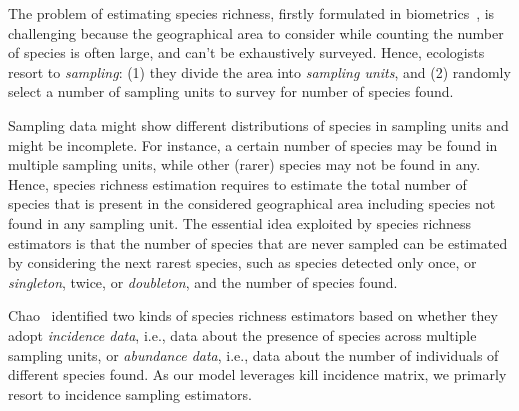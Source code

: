 \documentclass[sigconf,review,anonymous]{acmart}
\begin{document}
The problem of estimating species richness, firstly formulated in
biometrics~\cite{chao2016species}, is challenging because the geographical area
to consider while counting the number of species is often large, 
and can't be exhaustively surveyed.
%
Hence, ecologists resort to \emph{sampling}:
(1) they divide the area into \emph{sampling units}, and %
%
(2) randomly select a number of sampling units to survey for number of species found.

Sampling data might show different distributions of species in sampling units
and might be incomplete.
%
For instance, a certain number of species may be found in multiple sampling units,
while other (rarer) species may not be found in any. %
%
Hence, %
species richness estimation %
requires to estimate the total number of species that is present
in the considered geographical area including species not found in
any sampling unit.
The essential idea exploited by species richness estimators is that the number
of species that are never sampled %
can be estimated by considering the next rarest species, such as species
detected only once, or \emph{singleton}, twice, or \emph{doubleton}, %
and the number of species found. %
%

Chao~\cite{chao2016species} identified two kinds of species richness
estimators based on whether they adopt \emph{incidence data}, i.e., data about the
presence of species across multiple sampling units, or \emph{abundance data}, i.e.,
data about the number of individuals of different species found.
As our model leverages kill incidence matrix, we primarly resort to incidence sampling estimators.
\end{document}
